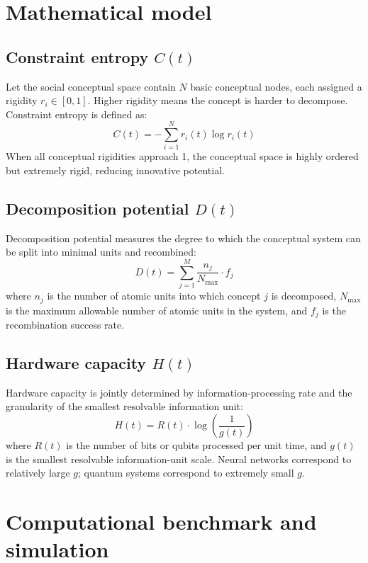 \documentclass[11pt,a4paper]{article}
\begin{document}
\section{Mathematical model}

\subsection{Constraint entropy $C(t)$}

Let the social conceptual space contain $N$ basic conceptual nodes, each assigned a rigidity $r_i \in [0,1]$. Higher rigidity means the concept is harder to decompose. Constraint entropy is defined as:
\begin{equation}
C(t) = -\sum_{i=1}^{N} r_i(t) \log r_i(t)
\end{equation}
When all conceptual rigidities approach 1, the conceptual space is highly ordered but extremely rigid, reducing innovative potential.

\subsection{Decomposition potential $D(t)$}

Decomposition potential measures the degree to which the conceptual system can be split into minimal units and recombined:
\begin{equation}
D(t) = \sum_{j=1}^{M} \frac{n_j}{N_{\max}} \cdot f_j
\end{equation}
where $n_j$ is the number of atomic units into which concept $j$ is decomposed, $N_{\max}$ is the maximum allowable number of atomic units in the system, and $f_j$ is the recombination success rate.

\subsection{Hardware capacity $H(t)$}

Hardware capacity is jointly determined by information-processing rate and the granularity of the smallest resolvable information unit:
\begin{equation}
H(t) = R(t) \cdot \log\left(\frac{1}{g(t)}\right)
\end{equation}
where $R(t)$ is the number of bits or qubits processed per unit time, and $g(t)$ is the smallest resolvable information-unit scale. Neural networks correspond to relatively large $g$; quantum systems correspond to extremely small $g$.

\section{Computational benchmark and simulation}
\end{document}
